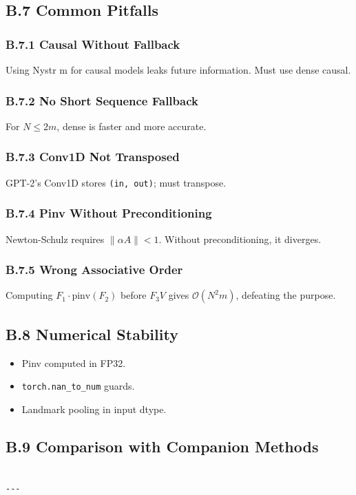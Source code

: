 \subsection{B.7 Common Pitfalls}

\subsubsection{B.7.1 Causal Without Fallback}

Using Nystr m for causal models leaks future information. Must use 
dense causal.

\subsubsection{B.7.2 No Short Sequence Fallback}

For $N \leq 2m$, dense is faster and more accurate.

\subsubsection{B.7.3 Conv1D Not Transposed}

GPT-2's Conv1D stores \texttt{(in, out)}; must transpose.

\subsubsection{B.7.4 Pinv Without Preconditioning}

Newton-Schulz requires $\|\alpha A\| < 1$. Without preconditioning, it 
diverges.

\subsubsection{B.7.5 Wrong Associative Order}

Computing $F_1 \cdot \text{pinv}(F_2)$ before $F_3 V$ gives $\mathcal{O}(N^2 m)$, 
defeating the purpose.

\subsection{B.8 Numerical Stability}

\begin{itemize}
\item Pinv computed in FP32.
\item \texttt{torch.nan\_to\_num} guards.
\item Landmark pooling in input dtype.

\end{itemize}
\subsection{B.9 Comparison with Companion Methods}

\begin{lstlisting}

---
\end{lstlisting}